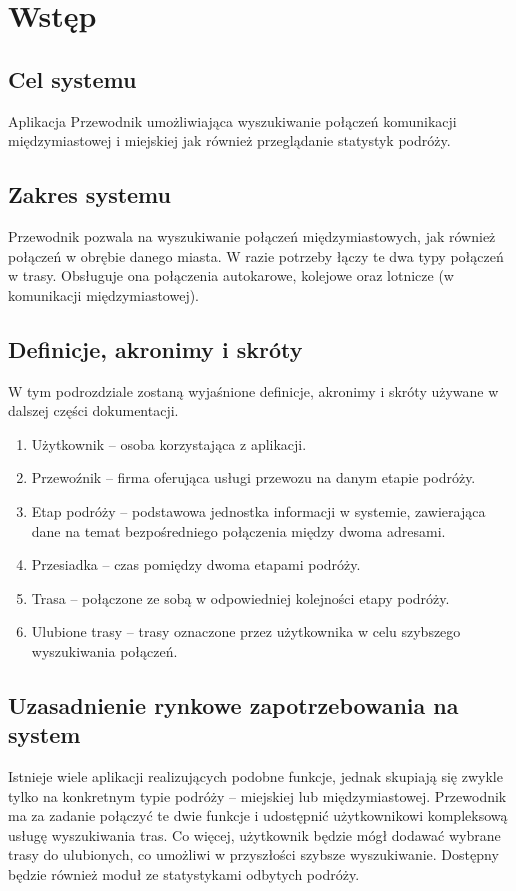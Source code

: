 \documentclass[12pt,a4paper]{report}
\begin{document}
\section{Wstęp}
\subsection{Cel systemu}
	Aplikacja Przewodnik umożliwiająca wyszukiwanie połączeń komunikacji międzymiastowej i miejskiej jak również przeglądanie statystyk podróży.
\subsection{Zakres systemu}
	Przewodnik pozwala na wyszukiwanie połączeń międzymiastowych, jak również połączeń w obrębie danego miasta. W razie potrzeby łączy te dwa typy połączeń w trasy. Obsługuje ona połączenia autokarowe, kolejowe oraz lotnicze (w komunikacji międzymiastowej).
\subsection{Definicje, akronimy i skróty}
	W tym podrozdziale zostaną wyjaśnione definicje, akronimy i skróty używane w dalszej części dokumentacji.
\begin{enumerate}
	\item Użytkownik -- osoba korzystająca z aplikacji.
	\item Przewoźnik -- firma oferująca usługi przewozu na danym etapie podróży.
	\item Etap podróży -- podstawowa jednostka informacji w systemie, zawierająca dane na temat bezpośredniego połączenia między dwoma adresami.
	\item Przesiadka -- czas pomiędzy dwoma etapami podróży.
	\item Trasa -- połączone ze sobą w odpowiedniej kolejności etapy podróży.
	\item Ulubione trasy -- trasy oznaczone przez użytkownika w celu szybszego wyszukiwania połączeń.
\end{enumerate}
\subsection{Uzasadnienie rynkowe zapotrzebowania na system}
	Istnieje wiele aplikacji realizujących podobne funkcje, jednak skupiają się zwykle tylko na konkretnym typie podróży -- miejskiej lub międzymiastowej. Przewodnik ma za zadanie połączyć te dwie funkcje i udostępnić użytkownikowi kompleksową usługę wyszukiwania tras. Co więcej, użytkownik będzie mógł dodawać wybrane trasy do ulubionych, co umożliwi w przyszłości szybsze wyszukiwanie. Dostępny będzie również moduł ze statystykami odbytych podróży.
\newpage
\end{document}
